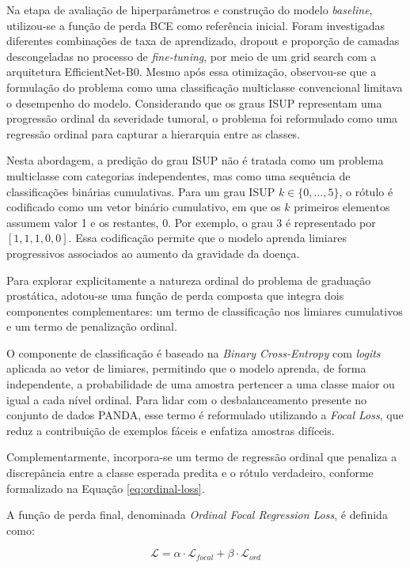 Na etapa de avaliação de hiperparâmetros e construção do modelo \textit{baseline}, utilizou-se a função de perda BCE como referência inicial. Foram investigadas diferentes combinações de taxa de aprendizado, dropout e proporção de camadas descongeladas no processo de \textit{fine-tuning}, por meio de um grid search com a arquitetura EfficientNet-B0. Mesmo após essa otimização, observou-se que a formulação do problema como uma classificação multiclasse convencional limitava o desempenho do modelo. Considerando que os graus ISUP representam uma progressão ordinal da severidade tumoral, o problema foi reformulado como uma regressão ordinal para capturar a hierarquia entre as classes.

Nesta abordagem, a predição do grau ISUP não é tratada como um problema multiclasse com categorias independentes, mas como uma sequência de classificações binárias cumulativas. Para um grau ISUP $k \in \{0,\dots,5\}$, o rótulo é codificado como um vetor binário cumulativo, em que os $k$ primeiros elementos assumem valor 1 e os restantes, 0. Por exemplo, o grau 3 é representado por $[1,1,1,0,0]$. Essa codificação permite que o modelo aprenda limiares progressivos associados ao aumento da gravidade da doença.

Para explorar explicitamente a natureza ordinal do problema de graduação prostática, adotou-se uma função de perda composta que integra dois componentes complementares: um termo de classificação nos limiares cumulativos e um termo de penalização ordinal.

O componente de classificação é baseado na \textit{Binary Cross-Entropy} com \textit{logits} aplicada ao vetor de limiares, permitindo que o modelo aprenda, de forma independente, a probabilidade de uma amostra pertencer a uma classe maior ou igual a cada nível ordinal. Para lidar com o desbalanceamento presente no conjunto de dados PANDA, esse termo é reformulado utilizando a \textit{Focal Loss}, que reduz a contribuição de exemplos fáceis e enfatiza amostras difíceis.

Complementarmente, incorpora-se um termo de regressão ordinal que penaliza a discrepância entre a classe esperada predita e o rótulo verdadeiro, conforme formalizado na Equação \ref{eq:ordinal-loss}.

A função de perda final, denominada \textit{Ordinal Focal Regression Loss}, é definida como:

\begin{equation}
	\mathcal{L} = \alpha \cdot \mathcal{L}_{focal} + \beta \cdot \mathcal{L}_{ord}
\end{equation}

